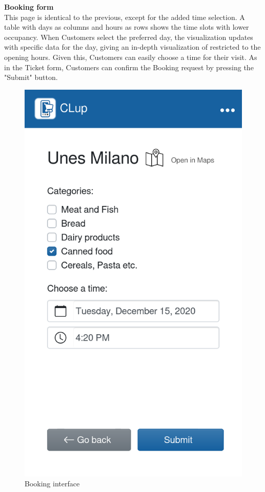 \textbf{Booking form}\\
\label{page:booking_form}
This page is identical to the previous, except for the added time selection. A table with days as columns and hours as rows shows the time slots with lower occupancy. When Customers select the preferred day, the visualization updates with specific data for the day, giving an in-depth visualization of restricted to the opening hours. Given this, Customers can easily choose a time for their visit. As in the Ticket form, Customers can confirm the Booking request by pressing the "Submit" button.
\begin{figure}[H]
    \centering
    \includegraphics[scale=0.25]{Images/booking-mockup.png}
    \caption{Booking interface}
\end{figure}

